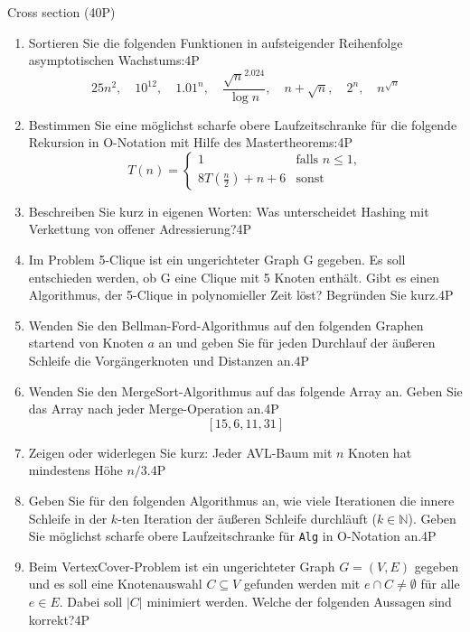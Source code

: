 \documentclass{article}
\begin{document}
\begin{exercise}{Cross section (40P)}
  \begin{enumerate}
    \item Sortieren Sie die folgenden Funktionen in aufsteigender Reihenfolge asymptotischen Wachstums:\hfill 4P\[
            25n^2,\quad 10^{12},\quad {1.01}^n,\quad \frac{\sqrt{n}^{2.024}}{\log n},\quad n + \sqrt{n},\quad 2^n,\quad n^{\sqrt{n}}
          \]
    \item Bestimmen Sie eine möglichst scharfe obere Laufzeitschranke für die folgende Rekursion in O-Notation mit Hilfe des Mastertheorems:\hfill{4P}\[
            T(n) =\begin{cases}
              1                                 & \text{falls } n \leq 1, \\
              8T\left(\frac{n}{2}\right) + n +6 & \text{sonst}
            \end{cases}
          \]
    \item Beschreiben Sie kurz in eigenen Worten: Was unterscheidet Hashing mit Verkettung von offener Adressierung?\hfill 4P
    \item Im Problem 5-Clique ist ein ungerichteter Graph G gegeben. Es soll entschieden werden, ob G eine Clique mit 5 Knoten enthält. Gibt es einen Algorithmus, der 5-Clique in polynomieller Zeit löst? Begründen Sie kurz.\hfill 4P
    \item Wenden Sie den Bellman-Ford-Algorithmus auf den folgenden Graphen startend von Knoten $a$ an und geben Sie für jeden Durchlauf der äußeren Schleife die Vorgängerknoten und Distanzen an.\hfill 4P
          
    \item Wenden Sie den MergeSort-Algorithmus auf das folgende Array an. Geben Sie das Array nach jeder Merge-Operation an.\hfill 4P\[
            [15,6,11,31]
          \]
    \item Zeigen oder widerlegen Sie kurz: Jeder AVL-Baum mit $n$ Knoten hat mindestens Höhe $n/3$.\hfill 4P
    \item Geben Sie für den folgenden Algorithmus an, wie viele Iterationen die innere Schleife in der $k$-ten Iteration der äußeren Schleife durchläuft ($k \in \mathbb{N}$). Geben Sie möglichst scharfe obere Laufzeitschranke für \texttt{Alg} in O-Notation an.\hfill 4P\par
          
    \item Beim VertexCover-Problem ist ein ungerichteter Graph $G = (V,E)$ gegeben und es soll eine Knotenauswahl $C \subseteq V$ gefunden werden mit $e \cap C \neq \emptyset$ für alle $e \in E$. Dabei soll $|C|$ minimiert werden. Welche der folgenden Aussagen sind korrekt?\hfill 4P

\end{enumerate}
\end{exercise}
\end{document}
